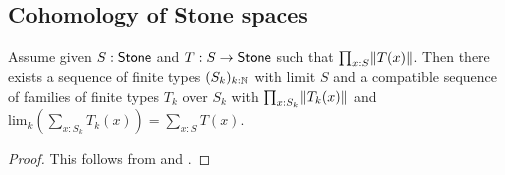 \subsection{Cohomology of Stone spaces}

%
%
%
\begin{lemma}\label{finite-approximation-surjection-stone}
Assume given $S:\mathsf{Stone}$ and $T:S\to\mathsf{Stone}$ such that $\prod_{x:S}\lVert T(x) \rVert$.
Then there exists a sequence of finite types $(S_k)_{k:\mathbb{N}}$ with limit $S$ 
and a compatible sequence of families of finite types $T_k$ over $S_k$
with $\prod_{x:S_k}\lVert T_k(x) \rVert$ and 
$\mathrm{lim}_k\left(\sum_{x:S_k}T_k(x)\right) = \sum_{x:S}T(x)$. 
%
\end{lemma}

\begin{proof}
  This follows from  and .
\end{proof}

